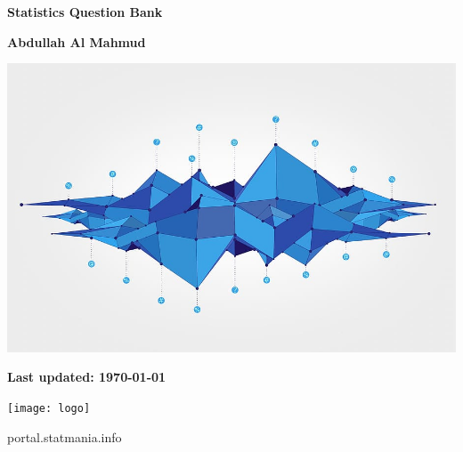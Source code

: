 \documentclass[12pt]{exam}
\begin{document}
\begin{titlepage}
    \begin{center}
        \vspace*{1cm}

        \Huge
        \textbf{Statistics Question Bank} \\



        \vspace{0.5cm}



        \vspace{1.5cm}

        \textbf{Abdullah Al Mahmud}

        \vspace{1.5cm}

        \includegraphics[width=19cm]{data}

        \vfill

            \textbf{Last updated: \today}
        \vspace{0.8cm}

             \texttt{[image: logo]}

        \Large
        portal.statmania.info\\

    \end{center}
\end{titlepage}

\newpage

\tableofcontents %

\newpage %
\end{document}
